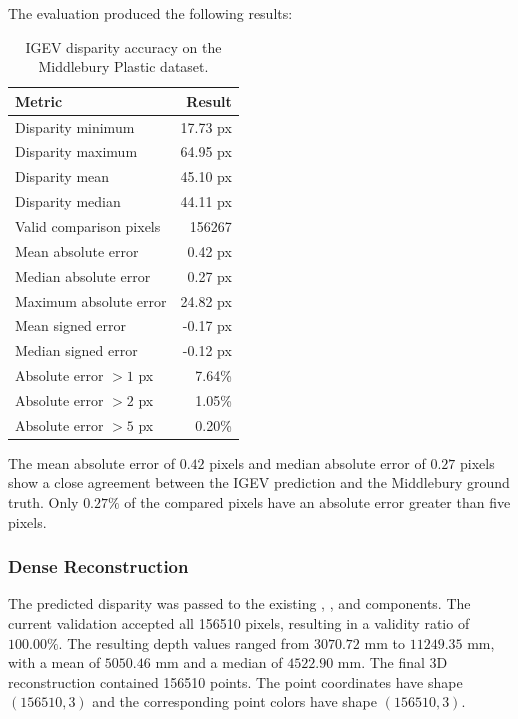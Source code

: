 The evaluation produced the following results:

\begin{table}[ht]
\centering
\caption{IGEV disparity accuracy on the Middlebury Plastic dataset.}
\label{tab:igev_disparity_accuracy}
\begin{tabular}{l r}
\hline
Metric & Result \\
\hline
Disparity minimum & 17.73 px \\
Disparity maximum & 64.95 px \\
Disparity mean & 45.10 px \\
Disparity median & 44.11 px \\
\hline
Valid comparison pixels & 156267 \\
Mean absolute error & 0.42 px \\
Median absolute error & 0.27 px \\
Maximum absolute error & 24.82 px \\
Mean signed error & -0.17 px \\
Median signed error & -0.12 px \\
Absolute error $> 1$ px & 7.64\% \\
Absolute error $> 2$ px & 1.05\% \\
Absolute error $> 5$ px & 0.20\% \\
\hline
\end{tabular}
\end{table}

The mean absolute error of $0.42$ pixels and median absolute error of
$0.27$ pixels show a close agreement between the IGEV prediction and the
Middlebury ground truth. Only $0.27\%$ of the compared pixels have an
absolute error greater than five pixels.

\subsubsection{Dense Reconstruction}

The predicted disparity was passed to the existing
, , and
 components.
The current validation accepted all 156510 pixels,
resulting in a validity ratio of $100.00\%$.
The resulting depth values ranged from $3070.72$ mm to $11249.35$ mm, with a
mean of $5050.46$ mm and a median of $4522.90$ mm.
The final 3D reconstruction contained 156510 points. The point coordinates
have shape $(156510, 3)$ and the corresponding point colors have shape
$(156510, 3)$.

